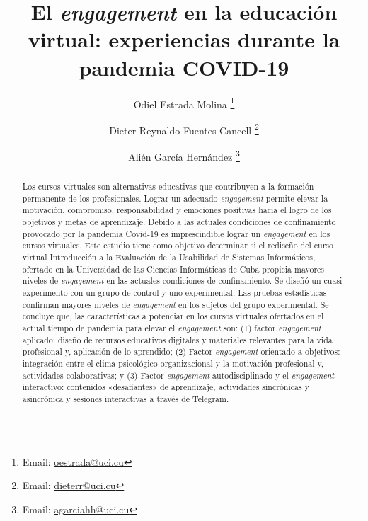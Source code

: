\documentclass{textolivre}
\title{El \textit{engagement} en la educación virtual: experiencias durante la pandemia COVID-19}
\author[1]{Odiel Estrada Molina \orcid{0000-0002-0918-418X} \thanks{Email: \url{oestrada@uci.cu}}}
\author[1]{Dieter Reynaldo Fuentes Cancell \orcid{0000-0002-2509-5400} \thanks{Email: \url{dieterr@uci.cu}}}
\author[1]{Alién García Hernández \orcid{0000-0002-9701-9351} \thanks{Email: \url{agarciahh@uci.cu}}}
\affil[1]{Facultad de Ciencias y Tecnologías Computacionales. Universidad de las Ciencias Informáticas, La Habana, Cuba.}
\begin{document}
\maketitle

\begin{polyabstract}
\begin{abstract}
Los cursos virtuales son alternativas educativas que contribuyen a la formación permanente de los profesionales. Lograr un adecuado \emph{engagement} permite elevar la motivación, compromiso, responsabilidad y emociones positivas hacia el logro de los objetivos y metas de aprendizaje. Debido a las actuales condiciones de confinamiento provocado por la pandemia Covid-19 es imprescindible lograr un \emph{engagement} en los cursos virtuales. Este estudio tiene como objetivo determinar si el rediseño del curso virtual Introducción a la Evaluación de la Usabilidad de Sistemas Informáticos, ofertado en la Universidad de las Ciencias Informáticas de Cuba propicia mayores niveles de \emph{engagement} en las actuales condiciones de confinamiento. Se diseñó un cuasi-experimento con un grupo de control y uno experimental. Las pruebas estadísticas confirman mayores niveles de \emph{engagement} en los sujetos del grupo experimental. Se concluye que, las características a potenciar en los cursos virtuales ofertados en el actual tiempo de pandemia para elevar el \emph{engagement} son: (1) factor \emph{engagement} aplicado: diseño de recursos educativos digitales y materiales relevantes para la vida profesional y, aplicación de lo aprendido; (2) Factor \emph{engagement} orientado a objetivos: integración entre el clima psicológico organizacional y la motivación profesional y, actividades colaborativas; y (3) Factor \emph{engagement} autodisciplinado y el \emph{engagement} interactivo: contenidos «desafiantes» de aprendizaje, actividades sincrónicas y asincrónica y sesiones interactivas a través de Telegram.


\end{abstract}


\end{polyabstract}
\end{document}
